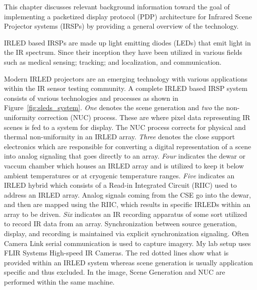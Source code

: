 \label{chap:background}

This chapter discusses relevant background information toward the goal of implementing a packetized display protocol (PDP) architecture for Infrared Scene Projector systems (IRSPs) by providing a general overview of the technology.

IRLED based IRSPs are made up light emitting diodes (LEDs) that emit light in the IR spectrum\cite{BiardGary1966}. Since their inception they have been utilized in various fields such as medical sensing\cite{YamanishiHamaguri1995,MeeksEtAl1998,Sadick2009,MonteiroEtAl2011,TakhtfooladiEtAl2015}; tracking; and localization\cite{Kimon2001,ZeylikovichEtAl2003,PlotogVladescu2015,ScholzEtAl2015,WalshDaemsSteckel2015}, and communication\cite{GeorgopoulosKormakopoulos1986,EscobosaEtAl2004,SohnEtAl2007,JangEtAl2012,CossuEtAl2014}.

Modern IRLED projectors are an emerging technology\cite{AhmedEtAl2018, NabhaEtAl2018, HernandezEtAl2018, HernandezEtAl2019_2, DeputyEtAl2019} with various applications within the IR sensor testing community. A complete IRLED based IRSP system consists of various technologies and processes as shown in Figure~\ref{fig:sleds_system}\cite{HouserEtAl2018_2}. \emph{One} denotes the scene generation and \emph{two} the non-uniformity correction (NUC) process. These are where pixel data representing IR scenes is fed to a system for display. The NUC process corrects for physical and thermal non-uniformity\cite{BarakhshanEtAl2017} in an IRLED array\cite{BarakhshanEtAl2018}. \emph{Three} denotes the close support electronics\cite{EjzakEtAl2015} which are responsible for converting a digital representation of a scene into analog signaling that goes directly to an array. \emph{Four} indicates the dewar\cite{LangeEtAl2011, MarksEtAl2017} or vaccum chamber which houses an IRLED array and is utilized to keep it below ambient temperatures or at cryogenic temperature ranges. \emph{Five} indicates an IRLED hybrid which consists of a Read-in Integrated Circuit (RIIC)\cite{HernandezEtAl2017} used to address an IRLED array. Analog signals coming from the CSE go into the dewar, and then are mapped using the RIIC, which results in specific IRLEDs within an array to be driven. \emph{Six} indicates an IR recording apparatus of some sort utilized to record IR data from an array. Synchronization between source generation, display, and recording is maintained via explicit synchronization signaling. Often Camera Link serial communication\cite{BaslerEtAl2000, ZhuEtAl2008} is used to capture imagery. My lab setup uses FLIR Systems High-speed IR Cameras\cite{FLIR2014_1, FLIR2014_1, FLIR2016}. The red dotted lines show what is provided within an IRLED system whereas scene generation is usually application specific and thus excluded. In the image, Scene Generation and NUC are performed within the same machine.

